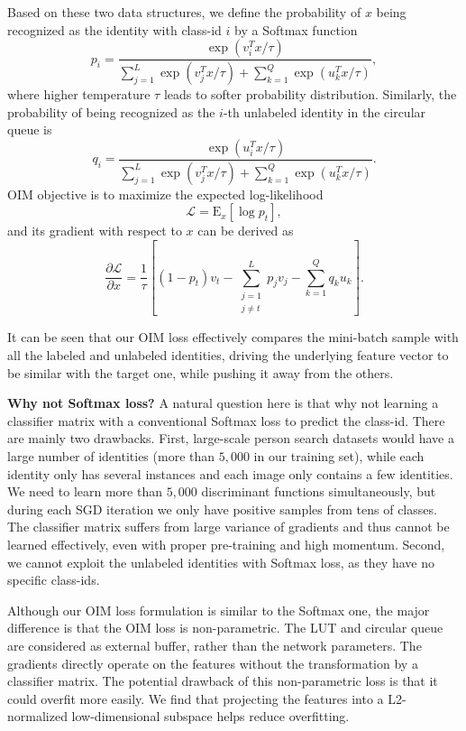 Based on these two data structures, we define the probability of $x$ being recognized as the identity with class-id $i$ by a Softmax function
\begin{equation} \label{eq:pi}
p_i=\frac{\exp(v_i^Tx/\tau)}{\sum_{j=1}^L\exp(v_j^Tx/\tau)+\sum_{k=1}^Q\exp(u_k^Tx/\tau)},
\end{equation}
where higher temperature $\tau$ leads to softer probability distribution. Similarly, the probability of being recognized as the $i$-th unlabeled identity in the circular queue is
\begin{equation} \label{eq:qi}
q_i=\frac{\exp(u_i^Tx/\tau)}{\sum_{j=1}^L\exp(v_j^Tx/\tau)+\sum_{k=1}^Q\exp(u_k^Tx/\tau)}.
\end{equation}
OIM objective is to maximize the expected log-likelihood
\begin{equation} \label{eq:loglik}
\mathcal{L}=\mathrm{E}_x\left[\log p_t\right],
\end{equation}
and its gradient with respect to $x$ can be derived as
\begin{equation}
\frac{\partial \mathcal{L}}{\partial x}=\frac{1}{\tau}\left[(1-p_t)v_t - \sum_{\substack{j=1\\j\ne t}}^L p_j v_j - \sum_{k=1}^Q q_k u_k\right].
\end{equation}

It can be seen that our OIM loss effectively compares the mini-batch sample with all the labeled and unlabeled identities, driving the underlying feature vector to be similar with the target one, while pushing it away from the others.

\textbf{Why not Softmax loss?} A natural question here is that why not learning a classifier matrix with a conventional Softmax loss to predict the class-id. There are mainly two drawbacks. First, large-scale person search datasets would have a large number of identities (more than $5,000$ in our training set), while each identity only has several instances and each image only contains a few identities. We need to learn more than $5,000$ discriminant functions simultaneously, but during each SGD iteration we only have positive samples from tens of classes. The classifier matrix suffers from large variance of gradients and thus cannot be learned effectively, even with proper pre-training and high momentum. Second, we cannot exploit the unlabeled identities with Softmax loss, as they have no specific class-ids.

Although our OIM loss formulation is similar to the Softmax one, the major difference is that the OIM loss is non-parametric. The LUT and circular queue are considered as external buffer, rather than the network parameters. The gradients directly operate on the features without the transformation by a classifier matrix. The potential drawback of this non-parametric loss is that it could overfit more easily. We find that projecting the features into a L2-normalized low-dimensional subspace helps reduce overfitting.

